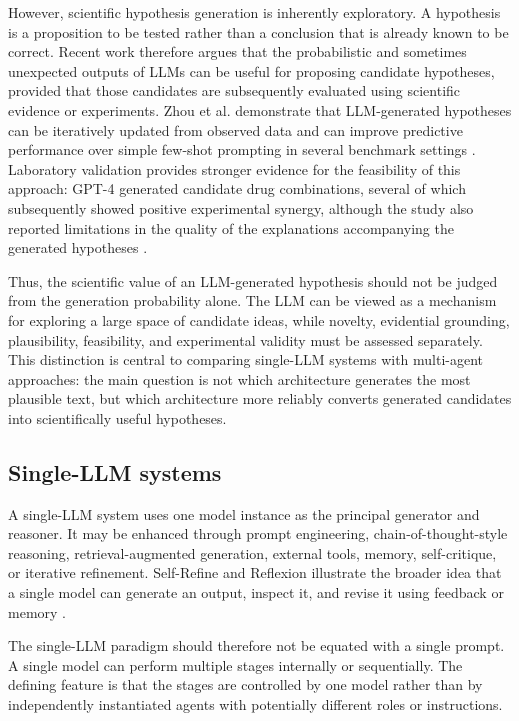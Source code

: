 \documentclass[11pt]{article}
\begin{document}
However, scientific hypothesis generation is inherently exploratory. A hypothesis is a proposition
to be tested rather than a conclusion that is already known to be correct. Recent work therefore
argues that the probabilistic and sometimes unexpected outputs of LLMs can be useful for proposing
candidate hypotheses, provided that those candidates are subsequently evaluated using scientific
evidence or experiments. Zhou et al. demonstrate that LLM-generated hypotheses can be iteratively
updated from observed data and can improve predictive performance over simple few-shot prompting
in several benchmark settings \cite{zhou2024hypothesis}. Laboratory validation provides stronger
evidence for the feasibility of this approach: GPT-4 generated candidate drug combinations, several
of which subsequently showed positive experimental synergy, although the study also reported
limitations in the quality of the explanations accompanying the generated hypotheses
\cite{abdelrehim2025scientific}.

Thus, the scientific value of an LLM-generated hypothesis should not be judged from the generation
probability alone. The LLM can be viewed as a mechanism for exploring a large space of candidate
ideas, while novelty, evidential grounding, plausibility, feasibility, and experimental validity
must be assessed separately. This distinction is central to comparing single-LLM systems with
multi-agent approaches: the main question is not which architecture generates the most plausible
text, but which architecture more reliably converts generated candidates into scientifically useful
hypotheses.

\subsection{Single-LLM systems}
\label{subsec:single-llm}

A single-LLM system uses one model instance as the principal generator and reasoner. It may be
enhanced through prompt engineering, chain-of-thought-style reasoning, retrieval-augmented
generation, external tools, memory, self-critique, or iterative refinement. Self-Refine and Reflexion
illustrate the broader idea that a single model can generate an output, inspect it, and revise it using
feedback or memory \cite{madaan2023selfrefine,shinn2023reflexion}.

The single-LLM paradigm should therefore not be equated with a single prompt. A single model
can perform multiple stages internally or sequentially. The defining feature is that the stages are
controlled by one model rather than by independently instantiated agents with potentially different
roles or instructions.
\end{document}
